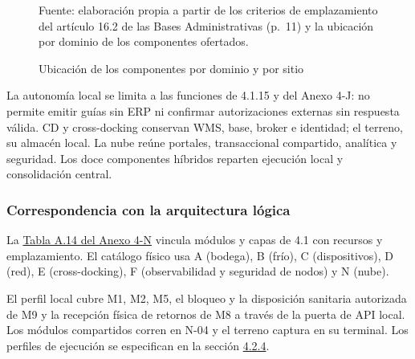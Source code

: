 \begin{figure}[htbp]
  \caption{Ubicación de los componentes por dominio y por sitio}
  \label{fig:emplazamiento-dominios}
  {\fontsize{9pt}{11pt}\selectfont\raggedright Fuente: elaboración propia a partir de los criterios de emplazamiento del artículo 16.2 de las Bases Administrativas (p.~11) y la ubicación por dominio de los componentes ofertados.\par}
\end{figure}

La autonomía local se limita a las funciones de 4.1.15 y del Anexo 4-J: no permite emitir guías sin ERP ni confirmar autorizaciones externas sin respuesta válida. CD y cross-docking conservan WMS, base, broker e identidad; el terreno, su almacén local. La nube reúne portales, transaccional compartido, analítica y seguridad. Los doce componentes híbridos reparten ejecución local y consolidación central.

\subsubsection{Correspondencia con la arquitectura lógica}

La \href{LAFROX-Subdocumento4-Anexos.pdf#tab:mapeo-logica}{Tabla A.14 del Anexo 4-N} vincula módulos y capas de 4.1 con recursos y emplazamiento. El catálogo físico usa A (bodega), B (frío), C (dispositivos), D (red), E (cross-docking), F (observabilidad y seguridad de nodos) y N (nube).



El perfil local cubre M1, M2, M5, el bloqueo y la disposición sanitaria autorizada de M9 y la recepción física de retornos de M8 a través de la puerta de API local. Los módulos compartidos corren en N-04 y el terreno captura en su terminal. Los perfiles de ejecución se especifican en la sección \hyperref[sec:despliegue]{4.2.4}.

